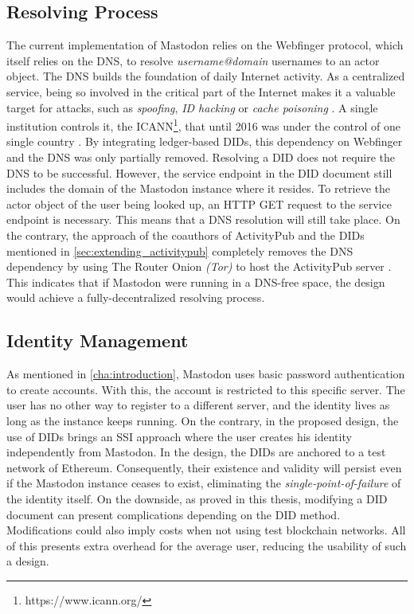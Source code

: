 \subsection{Resolving Process}
The current implementation of Mastodon relies on the Webfinger protocol, which itself relies on the DNS, to resolve \emph{username@domain} usernames to an actor object. The DNS builds the foundation of daily Internet activity. As a centralized service, being so involved in the critical part of the Internet makes it a valuable target for attacks, such as \emph{spoofing}, \emph{ID hacking} or \emph{cache poisoning} \cite{carli2003security}. A single institution controls it, the ICANN\footnote{https://www.icann.org/}, that until 2016 was under the control of one single country \cite{lee_2016}. 
By integrating ledger-based DIDs, this dependency on Webfinger and the DNS was only partially removed. Resolving a DID does not require the DNS to be successful. However, the service endpoint in the DID document still includes the domain of the Mastodon instance where it resides. To retrieve the actor object of the user being looked up, an HTTP GET request to the service endpoint is necessary. This means that a DNS resolution will still take place. On the contrary, the approach of the coauthors of ActivityPub and the DIDs mentioned in \ref{sec:extending_activitypub} completely removes the DNS dependency by using The Router Onion \emph{(Tor)} to host the ActivityPub server \cite{webber_sporny_2017}. This indicates that if Mastodon were running in a DNS-free space, the design would achieve a fully-decentralized resolving process. 
 
\subsection{Identity Management}

As mentioned in \ref{cha:introduction}, Mastodon uses basic password authentication to create accounts. With this, the account is restricted to this specific server. The user has no other way to register to a different server, and the identity lives as long as the instance keeps running. On the contrary, in the proposed design, the use of DIDs brings an SSI approach where the user creates his identity independently from Mastodon. In the design, the DIDs are anchored to a test network of Ethereum. Consequently, their existence and validity will persist even if the Mastodon instance ceases to exist, eliminating the \emph{single-point-of-failure} of the identity itself. On the downside, as proved in this thesis, modifying a DID document can present complications depending on the DID method. Modifications could also imply costs when not using test blockchain networks. All of this presents extra overhead for the average user, reducing the usability of such a design. 

